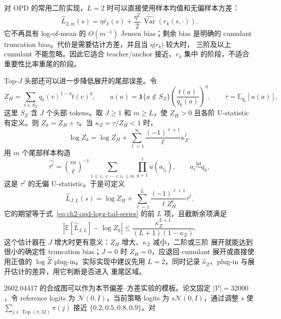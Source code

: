 对 OPD 的常用二阶实现，$L=2$ 时可以直接使用样本均值和无偏样本方差：
\begin{equation}
\widehat L_{2,m}(s)=\eta\bar r_k(s)
 +\frac{\eta^2}{2}\,\widehat{\operatorname{Var}}(r_k(s,\cdot)).
\label{eq:ch2-opd-logz-second-estimator}
\end{equation}
它不再具有 log-of-mean 的 $O(m^{-1})$ Jensen bias；剩余 bias 是明确的 cumulant truncation bias。代价是需要估计方差，并且当 $\eta|r_k|$ 较大时， 三阶及以上 cumulant 不能忽略。因此它适合 teacher/anchor 接近、$r_k$ 集中 的阶段，不适合重要性比率重尾的阶段。

Top-$J$ 头部还可以进一步降低展开的尾部误差。令
\begin{equation}
Z_H=\sum_{v\in S_Z}q_k(v)^{1-\eta}t(v)^\eta,
\qquad
u(a)=\mathbf 1\{a\notin S_Z\}
 \left(\frac{t(a)}{q_k(a)}\right)^\eta,
\qquad \tau=\mathbb E_{q_k}[u(a)],
\end{equation}
这里 $S_Z$ 含 $J$ 个头部 tokens。取 $J\ge1$ 和 $m\ge L$，使 $Z_H>0$ 且各阶 U-statistic 有定义。则 $Z_k=Z_H+\tau$。当 $\kappa_Z=\tau/Z_H<1$ 时，
\begin{equation}
\log Z_k=\log Z_H+
\sum_{\ell=1}^{\infty}\frac{(-1)^{\ell+1}}{\ell}\kappa_Z^\ell.
\label{eq:ch2-opd-logz-tail-series}
\end{equation}
用 $m$ 个尾部样本构造
\begin{equation}
\widehat{\tau^\ell}=\binom{m}{\ell}^{-1}
\sum_{1\le i_1<\cdots<i_\ell\le m}
\prod_{q=1}^{\ell}u(a_{i_q}),
\qquad a_i\overset{\mathrm{iid}}{\sim}q_k,
\end{equation}
这是 $\tau^\ell$ 的无偏 U-statistic。于是可定义
\begin{equation}
\widehat L_{J,L}(s)=\log Z_H+
\sum_{\ell=1}^{L}\frac{(-1)^{\ell+1}}{\ell Z_H^\ell}
\widehat{\tau^\ell}.
\label{eq:ch2-opd-logz-tail-series-estimator}
\end{equation}
它的期望等于式~\eqref{eq:ch2-opd-logz-tail-series} 的前 $L$ 项，且截断余项满足
\begin{equation}
\left|\mathbb E[\widehat L_{J,L}]-\log Z_k\right|
\leq \frac{\kappa_Z^{L+1}}{(L+1)(1-\kappa_Z)}.
\label{eq:ch2-opd-logz-tail-remainder}
\end{equation}
这个估计器在 $J$ 增大时更有意义：$Z_H$ 增大、$\kappa_Z$ 减小，二阶或三阶 展开就能达到很小的确定性 truncation bias；$J=0$ 时 $Z_H=0$，应退回 cumulant 展开或直接使用正值的 $\log\widehat Z$ plug-in。实际实现中建议先用 $L=2$，同时记录 $\widehat\kappa_Z$、plug-in 与展开估计的差异，用它判断是否进入 重尾区域。

2602.04417 的合成图可以作为本节偏差--方差实验的模板。论文固定 $|\mathcal V|=32000$，令 reference logits 为 $\mathcal N(0,I)$，当前策略 logits 为 $s\mathcal N(0,I)$，通过调整 $s$ 使 $\sum_{j\in\operatorname{Top}(\pi,32)}\pi(j)$ 接近 $\{0.2,0.5,0.8,0.9\}$。对

